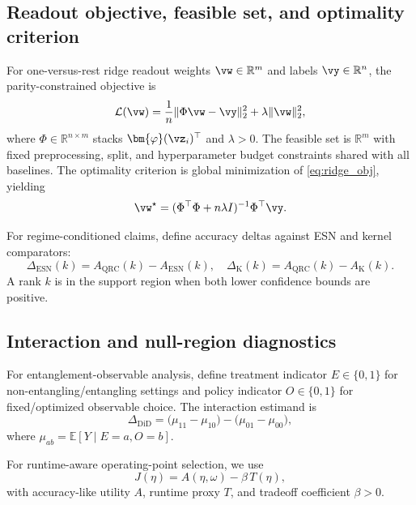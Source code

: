 \subsection{Readout objective, feasible set, and optimality criterion}
For one-versus-rest ridge readout weights $\vw\in\mathbb{R}^{m}$ and labels $\vy\in\mathbb{R}^{n}$, the parity-constrained objective is
\begin{equation}
\mathcal{L}(\vw)=\frac{1}{n}\|\Phi\vw-\vy\|_2^2+\lambda\|\vw\|_2^2,
\label{eq:ridge_obj}
\end{equation}
where $\Phi\in\mathbb{R}^{n\times m}$ stacks $\bm{\varphi}(\vz_i)^\top$ and $\lambda>0$. The feasible set is $\mathbb{R}^{m}$ with fixed preprocessing, split, and hyperparameter budget constraints shared with all baselines. The optimality criterion is global minimization of \eqref{eq:ridge_obj}, yielding
\begin{equation}
\vw^\star=(\Phi^\top\Phi+n\lambda I)^{-1}\Phi^\top\vy.
\label{eq:ridge_solution}
\end{equation}

For regime-conditioned claims, define accuracy deltas against ESN and kernel comparators:
\begin{equation}
\Delta_{\text{ESN}}(k)=A_{\text{QRC}}(k)-A_{\text{ESN}}(k),\quad
\Delta_{\text{K}}(k)=A_{\text{QRC}}(k)-A_{\text{K}}(k).
\label{eq:deltas}
\end{equation}
A rank $k$ is in the support region when both lower confidence bounds are positive.

\subsection{Interaction and null-region diagnostics}
For entanglement-observable analysis, define treatment indicator $E\in\{0,1\}$ for non-entangling/entangling settings and policy indicator $O\in\{0,1\}$ for fixed/optimized observable choice. The interaction estimand is
\begin{equation}
\Delta_{\mathrm{DiD}}=\big(\mu_{11}-\mu_{10}\big)-\big(\mu_{01}-\mu_{00}\big),
\label{eq:did}
\end{equation}
where $\mu_{ab}=\mathbb{E}[Y\mid E=a,O=b]$.

For runtime-aware operating-point selection, we use
\begin{equation}
J(\eta)=A(\eta,\omega)-\beta\,T(\eta),
\label{eq:utility}
\end{equation}
with accuracy-like utility $A$, runtime proxy $T$, and tradeoff coefficient $\beta>0$.


